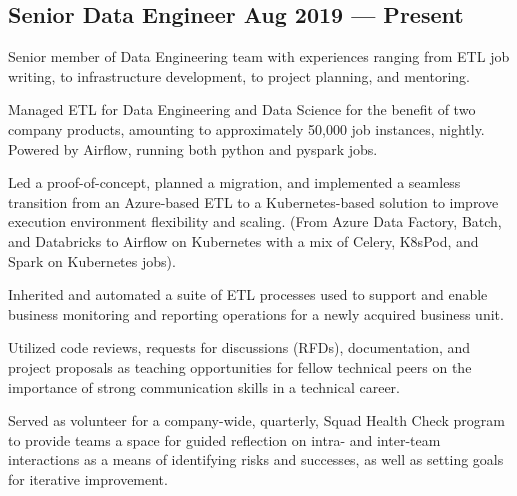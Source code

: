 \documentclass[letter,10pt]{article}
\begin{document}
\subsection{{Senior Data Engineer \hfill Aug 2019 --- Present}}

\vspace{10pt}

Senior member of Data Engineering team with experiences ranging from ETL job writing, to infrastructure development, to project planning, and mentoring.

\vspace{10pt}

\begin{zitemize}
    \item Managed ETL for Data Engineering and Data Science for the benefit of two company products, amounting to approximately 50,000 job instances, nightly. Powered by Airflow, running both python and pyspark jobs.
    \item Led a proof-of-concept, planned a migration, and implemented a seamless transition from an Azure-based ETL to a Kubernetes-based solution to improve execution environment flexibility and scaling. (From Azure Data Factory, Batch, and Databricks to Airflow on Kubernetes with a mix of Celery, K8sPod, and Spark on Kubernetes jobs).
    \item Inherited and automated a suite of ETL processes used to support and enable business monitoring and reporting operations for a newly acquired business unit.
    \item Utilized code reviews, requests for discussions (RFDs), documentation, and project proposals as teaching opportunities for fellow technical peers on the importance of strong communication skills in a technical career.
    \item Served as volunteer for a company-wide, quarterly, Squad Health Check program to provide teams a space for guided reflection on intra- and inter-team interactions as a means of identifying risks and successes, as well as setting goals for iterative improvement.
\end{zitemize}

\vspace{5pt}
\vspace{5pt}

\end{document}
